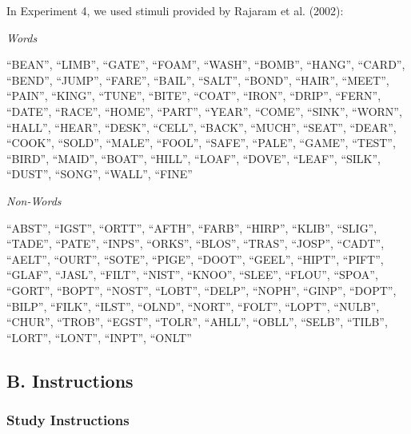 \documentclass[english,,man,floatsintext]{apa6}
\begin{document}
In Experiment 4, we used stimuli provided by Rajaram et al. (2002):

\emph{Words}

\enquote{BEAN}, \enquote{LIMB}, \enquote{GATE}, \enquote{FOAM}, \enquote{WASH}, \enquote{BOMB}, \enquote{HANG}, \enquote{CARD}, \enquote{BEND}, \enquote{JUMP}, \enquote{FARE}, \enquote{BAIL}, \enquote{SALT}, \enquote{BOND}, \enquote{HAIR}, \enquote{MEET}, \enquote{PAIN}, \enquote{KING}, \enquote{TUNE}, \enquote{BITE}, \enquote{COAT}, \enquote{IRON}, \enquote{DRIP}, \enquote{FERN}, \enquote{DATE}, \enquote{RACE}, \enquote{HOME}, \enquote{PART}, \enquote{YEAR}, \enquote{COME}, \enquote{SINK}, \enquote{WORN}, \enquote{HALL}, \enquote{HEAR}, \enquote{DESK}, \enquote{CELL}, \enquote{BACK}, \enquote{MUCH}, \enquote{SEAT}, \enquote{DEAR}, \enquote{COOK}, \enquote{SOLD}, \enquote{MALE}, \enquote{FOOL}, \enquote{SAFE}, \enquote{PALE}, \enquote{GAME}, \enquote{TEST}, \enquote{BIRD}, \enquote{MAID}, \enquote{BOAT}, \enquote{HILL}, \enquote{LOAF}, \enquote{DOVE}, \enquote{LEAF}, \enquote{SILK}, \enquote{DUST}, \enquote{SONG}, \enquote{WALL}, \enquote{FINE}

\emph{Non-Words}

\enquote{ABST}, \enquote{IGST}, \enquote{ORTT}, \enquote{AFTH}, \enquote{FARB}, \enquote{HIRP}, \enquote{KLIB}, \enquote{SLIG}, \enquote{TADE}, \enquote{PATE}, \enquote{INPS}, \enquote{ORKS}, \enquote{BLOS}, \enquote{TRAS}, \enquote{JOSP}, \enquote{CADT}, \enquote{AELT}, \enquote{OURT}, \enquote{SOTE}, \enquote{PIGE}, \enquote{DOOT}, \enquote{GEEL}, \enquote{HIPT}, \enquote{PIFT}, \enquote{GLAF}, \enquote{JASL}, \enquote{FILT}, \enquote{NIST}, \enquote{KNOO}, \enquote{SLEE}, \enquote{FLOU}, \enquote{SPOA}, \enquote{GORT}, \enquote{BOPT}, \enquote{NOST}, \enquote{LOBT}, \enquote{DELP}, \enquote{NOPH}, \enquote{GINP}, \enquote{DOPT}, \enquote{BILP}, \enquote{FILK}, \enquote{ILST}, \enquote{OLND}, \enquote{NORT}, \enquote{FOLT}, \enquote{LOPT}, \enquote{NULB}, \enquote{CHUR}, \enquote{TROB}, \enquote{EGST}, \enquote{TOLR}, \enquote{AHLL}, \enquote{OBLL}, \enquote{SELB}, \enquote{TILB}, \enquote{LORT}, \enquote{LONT}, \enquote{INPT}, \enquote{ONLT}

\newpage

\hypertarget{b.-instructions}{%
\subsection{B. Instructions}\label{b.-instructions}}

\hypertarget{study-instructions}{%
\subsubsection{Study Instructions}\label{study-instructions}}
\end{document}
